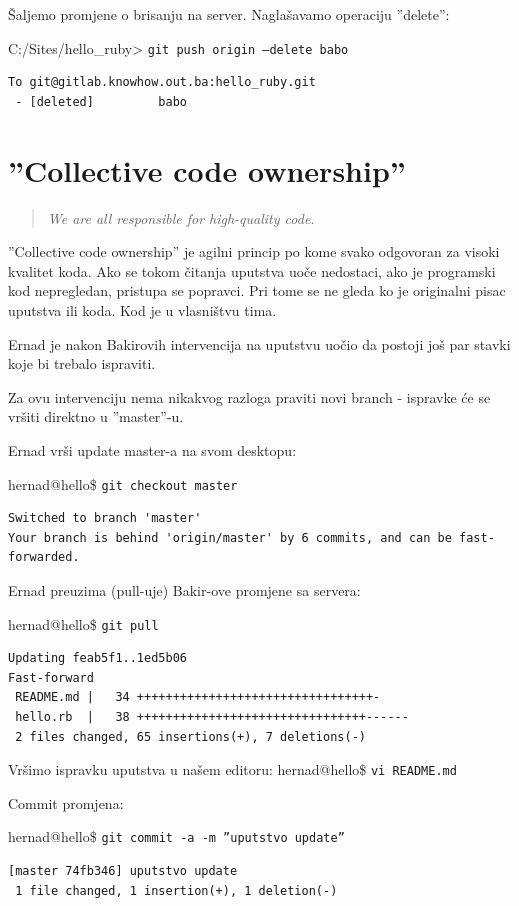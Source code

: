 \documentclass[times, utf8, seminar]{fit}
\begin{document}
Šaljemo promjene o brisanju na server. Naglašavamo operaciju ''delete'':

C:/Sites/hello\_ruby> \texttt{git push origin --delete babo}
\begin{lstlisting}
To git@gitlab.knowhow.out.ba:hello_ruby.git
 - [deleted]         babo
\end{lstlisting}

\section{''Collective code ownership''}

\begin{quotation}
  \emph{We are all responsible for high-quality code.}
\end{quotation}

''Collective code ownership''\citep[str. ]{agileart} je agilni princip po kome svako odgovoran za visoki kvalitet koda.
Ako se tokom čitanja uputstva uoče nedostaci, ako je programski kod nepregledan, pristupa se popravci.
Pri tome se ne gleda ko je originalni pisac uputstva ili koda. Kod je u vlasništvu tima.

Ernad je nakon Bakirovih intervencija na uputstvu uočio da postoji još par stavki koje bi trebalo ispraviti.

Za ovu intervenciju nema nikakvog razloga praviti novi branch - ispravke će se vršiti direktno u ''master''-u.

Ernad vrši update master-a na svom desktopu:

hernad@hello\ruby\$ \texttt{git checkout master}
\begin{lstlisting}
Switched to branch 'master'
Your branch is behind 'origin/master' by 6 commits, and can be fast-forwarded.
\end{lstlisting}

Ernad preuzima (pull-uje) Bakir-ove promjene sa servera:

hernad@hello\ruby\$ \texttt{git pull}
\begin{lstlisting}
Updating feab5f1..1ed5b06
Fast-forward
 README.md |   34 +++++++++++++++++++++++++++++++++-
 hello.rb  |   38 ++++++++++++++++++++++++++++++++------
 2 files changed, 65 insertions(+), 7 deletions(-)
\end{lstlisting}

Vršimo ispravku uputstva u našem editoru:
hernad@hello\ruby\$ \texttt{vi README.md}

Commit promjena:

hernad@hello\ruby\$ \texttt{git commit -a -m ''uputstvo update''}
\begin{lstlisting}
[master 74fb346] uputstvo update
 1 file changed, 1 insertion(+), 1 deletion(-)
\end{lstlisting}
\end{document}
